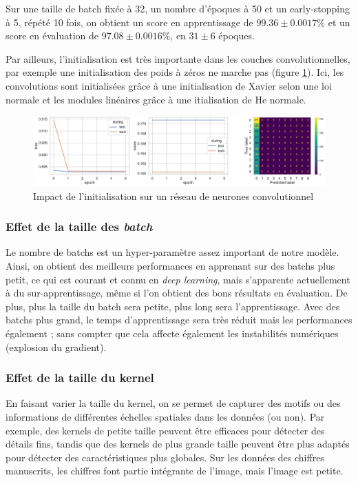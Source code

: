 \documentclass{article}
\begin{document}
Sur une taille de batch fixée à 32, un nombre d'époques à 50 et un early-stopping à 5, répété 10 fois, on obtient un score en apprentissage de $ 99.36 \pm 0.0017\% $ et un score en évaluation de $ 97.08 \pm 0.0016 \% $, en $ 31 \pm 6 $ époques. 

Par ailleurs, l'initialisation est très importante dans les couches convolutionnelles, par exemple une initialisation des poids à zéros ne marche pas (figure \ref{fig:convinit}). Ici, les convolutions sont initialisées grâce à une initialisation de Xavier selon une loi normale et les modules linéaires grâce à une itialisation de He normale.

\begin{figure}[htbp]
    \centering
    \includegraphics[width=\textwidth]{conv/conv_32batch_zeros.pdf}
    \caption{Impact de l'initialisation sur un réseau de neurones convolutionnel}
    \label{fig:convinit}
\end{figure}


\subsubsection{Effet de la taille des \textit{batch}}

Le nombre de batchs est un hyper-paramètre assez important de notre modèle. Ainsi, on obtient des meilleurs performances en apprenant sur des batchs plus petit, ce qui est courant et connu en \textit{deep learning}, mais s'apparente actuellement à du sur-apprentissage, même si l'on obtient des bons résultats en évaluation. De plus, plus la taille du batch sera petite, plus long sera l'apprentissage. Avec des batchs plus grand, le temps d'apprentissage sera très réduit mais les performances également ; sans compter que cela affecte également les instabilités numériques (explosion du gradient).

\subsubsection{Effet de la taille du kernel}

En faisant varier la taille du kernel, on se permet de capturer des motifs ou des informations de différentes échelles spatiales dans les données (ou non). Par exemple, des kernels de petite taille peuvent être efficaces pour détecter des détails fins, tandis que des kernels de plus grande taille peuvent être plus adaptés pour détecter des caractéristiques plus globales. Sur les données des chiffres manuscrits, les chiffres font partie intégrante de l'image, mais l'image est petite.
\end{document}
